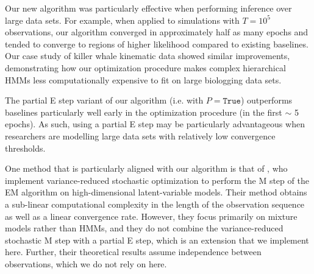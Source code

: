 Our new algorithm was particularly effective when performing inference over large data sets. For example, when applied to simulations with $T=10^{5}$ observations, our algorithm converged in approximately half as many epochs and tended to converge to regions of higher likelihood compared to existing baselines. Our case study of killer whale kinematic data showed similar improvements, demonstrating how our optimization procedure makes complex hierarchical HMMs less computationally expensive to fit on large biologging data sets.

The partial E step variant of our algorithm (i.e. with $P = \texttt{True}$) outperforms baselines particularly well early in the optimization procedure (in the first $\sim$ 5 epochs). As such, using a partial E step may be particularly advantageous when researchers are modelling large data sets with relatively low convergence thresholds.

One method that is particularly aligned with our algorithm is that of \citet{Zhu:2017}, who implement variance-reduced stochastic optimization to perform the M step of the EM algorithm on high-dimensional latent-variable models. Their method obtains a sub-linear computational complexity in the length of the observation sequence as well as a linear convergence rate. However, they focus primarily on mixture models rather than HMMs, and they do not combine the variance-reduced stochastic M step with a partial E step, which is an extension that we implement here. Further, their theoretical results assume independence between observations, which we do not rely on here.


